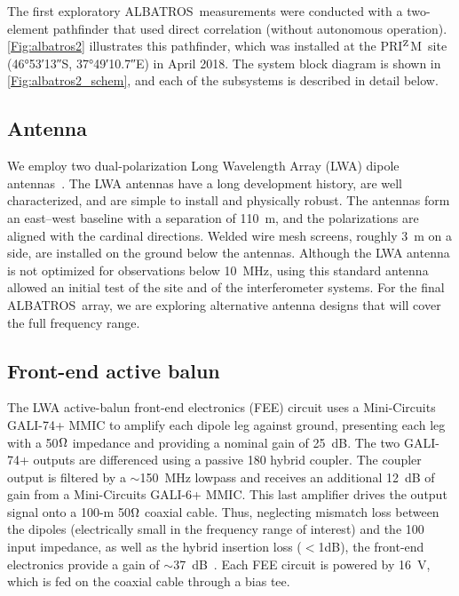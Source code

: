 \documentclass{ws-jai}
\def\albatros{ALBATROS}
\def\prizm{PRI$^{\rm Z}$M}
\begin{document}
The first exploratory \albatros\ measurements were conducted with a
two-element pathfinder that used direct correlation (without
autonomous operation).  \autoref{Fig:albatros2} illustrates this
pathfinder, which was installed at the \prizm\ site (\ang{46;53;13}S,
\ang{37;49;10.7}E) in April 2018.  The system block diagram is shown
in \autoref{Fig:albatros2_schem}, and each of the subsystems is
described in detail below.

\subsection{Antenna}\label{s:antenna}

We employ two dual-polarization Long Wavelength Array (LWA) dipole
antennas~\citep{Memo28}.  The LWA antennas have a long development
history, are well characterized, and are simple to install and
physically robust.  The antennas form an east--west baseline with a
separation of \SI{110}{m}, and the polarizations are aligned with the
cardinal directions.  Welded wire mesh screens, roughly 3~m on a side,
are installed on the ground below the antennas.  Although the LWA
antenna is not optimized for observations below 10~MHz, using this
standard antenna allowed an initial test of the site and of the
interferometer systems.  For the final \albatros\ array, we are
exploring alternative antenna designs that will cover the full
frequency range.


\subsection{Front-end active balun}\label{s:fee}

The LWA active-balun front-end electronics (FEE) circuit uses a
Mini-Circuits GALI-74+ MMIC to amplify each dipole leg against ground,
presenting each leg with a 50$\ohm$ impedance and providing a nominal
gain of 25~dB. The two GALI-74+ outputs are differenced using a
passive {180\degree} hybrid coupler. The coupler output is filtered by
a $\sim$150~MHz lowpass and receives an additional 12~dB of gain from
a Mini-Circuits GALI-6+ MMIC. This last amplifier drives the output
signal onto a 100-m 50$\ohm$ coaxial cable. Thus, neglecting mismatch
loss between the dipoles (electrically small in the frequency range of
interest) and the 100{\ohm} input impedance, as well as the hybrid
insertion loss ($<$1dB), the front-end electronics provide a gain of
$\sim$37~dB~\citep{2012PASP..124.1090H}.  Each FEE circuit is powered
by 16~V, which is fed on the coaxial cable through a bias tee.
\end{document}
